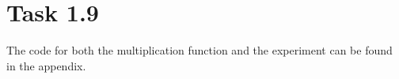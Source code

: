 \section{Task 1.9}
The code for both the multiplication function and the experiment can be found in the appendix.

